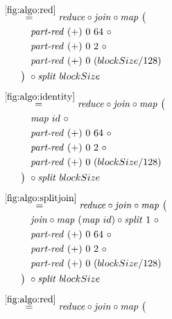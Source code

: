 \begin{align*}
%
  &\hspace{-2em}\quad\begin{aligned}
    &\overset{\ref{fig:algo:red}}{=\hspace{.2em}}
      \reduce \circ \join \circ \map\ \big(\\
    &\qquad\quad\partRed\ (+)\ 0\ 64\ \circ\\
    &\qquad\quad\partRed\ (+)\ 0\ 2\ \circ \\
    &\qquad\quad\partRed\ (+)\ 0\ (blockSize/128)\\
    &\qquad\big)\ \circ \splitN\ blockSize
  \end{aligned}\\[.5em]
%
  &\hspace{-2em}\quad\begin{aligned}
    &\overset{\ref{fig:algo:identity}}{=\hspace{.2em}}
      \reduce \circ \join \circ \map\ \big(\\
    &\qquad\quad\map\ id\ \circ \\
    &\qquad\quad\partRed\ (+)\ 0\ 64\ \circ\\
    &\qquad\quad\partRed\ (+)\ 0\ 2\ \circ \\
    &\qquad\quad\partRed\ (+)\ 0\ (blockSize/128)\\
    &\qquad\big)\ \circ \splitN\ blockSize
  \end{aligned}\\[.5em]
%
  &\hspace{-2em}\quad\begin{aligned}
    &\overset{\ref{fig:algo:splitjoin}}{=\hspace{.2em}}
      \reduce \circ \join \circ \map\ \big(\\
    &\qquad\quad\join \circ \map\ (\map\ id) \circ \splitN\ 1\ \circ\\
    &\qquad\quad\partRed\ (+)\ 0\ 64\ \circ\\
    &\qquad\quad\partRed\ (+)\ 0\ 2\ \circ \\
    &\qquad\quad\partRed\ (+)\ 0\ (blockSize/128)\\
    &\qquad\big)\ \circ \splitN\ blockSize
  \end{aligned}\\[.5em]
%
  &\hspace{-2em}\quad\begin{aligned}
    &\overset{\ref{fig:algo:red}}{=\hspace{.2em}}
      \reduce \circ \join \circ \map\ \big(\\

\end{aligned}
\end{align*}
